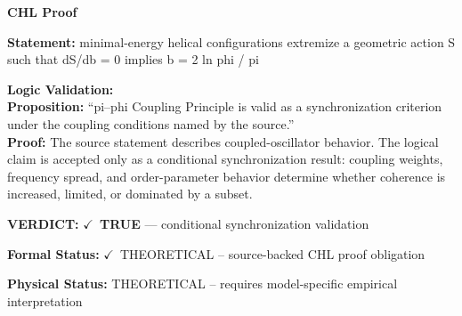 \vspace{0.45em}
\noindent\textbf{CHL Proof}\par
\textbf{Statement:} minimal-energy helical configurations extremize a geometric action S such that dS/db = 0
implies b = 2 ln phi / pi

\textbf{Logic Validation:}\\
\textbf{Proposition:} ``pi--phi Coupling Principle is valid as a synchronization criterion under the coupling
conditions named by the source.''\\
\textbf{Proof:} The source statement describes coupled-oscillator behavior. The logical claim is
accepted only as a conditional synchronization result: coupling weights, frequency
spread, and order-parameter behavior determine whether coherence is increased, limited,
or dominated by a subset.

\textbf{VERDICT:} \ensuremath{\checkmark}\ \textbf{TRUE} --- conditional synchronization validation

\textbf{Formal Status:} \ensuremath{\checkmark}\ THEORETICAL -- source-backed CHL proof obligation

\textbf{Physical Status:} THEORETICAL -- requires model-specific empirical interpretation
\par\vspace{0.45em}
\par
\ifTZPDarkEdition
{}
\fi
\endgroup
\endgroup
